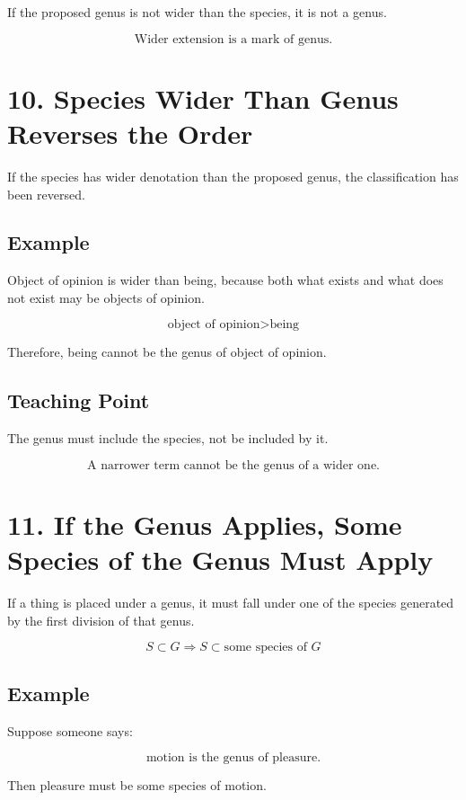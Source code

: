 \documentclass[12pt]{article}
\begin{document}
If the proposed genus is not wider than the species, it is not a genus.

\[
\boxed{
\text{Wider extension is a mark of genus.}
}
\]

\section*{10. Species Wider Than Genus Reverses the Order}

If the species has wider denotation than the proposed genus, the classification
has been reversed.

\subsection*{Example}

Object of opinion is wider than being, because both what exists and what does
not exist may be objects of opinion.

\[
\text{object of opinion} > \text{being}
\]

Therefore, being cannot be the genus of object of opinion.

\subsection*{Teaching Point}

The genus must include the species, not be included by it.

\[
\boxed{
\text{A narrower term cannot be the genus of a wider one.}
}
\]

\section*{11. If the Genus Applies, Some Species of the Genus Must Apply}

If a thing is placed under a genus, it must fall under one of the species
generated by the first division of that genus.

\[
S \subset G
\Rightarrow
S \subset \text{some species of } G
\]

\subsection*{Example}

Suppose someone says:

\[
\text{motion is the genus of pleasure.}
\]

Then pleasure must be some species of motion.
\end{document}
